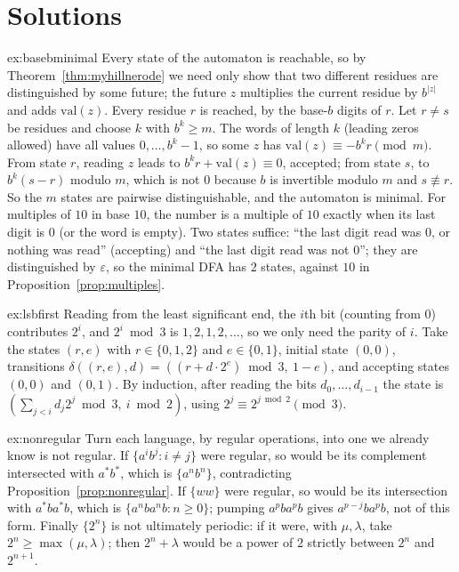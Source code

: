 \section{Solutions}

\begin{solution}{ex:basebminimal}
\idea Every state of the automaton is reachable, so by Theorem~\ref{thm:myhillnerode} we need only show that two different residues are distinguished by some future; the future $z$ multiplies the current residue by $b^{|z|}$ and adds $\mathrm{val}(z)$.
\writeup Every residue $r$ is reached, by the base-$b$ digits of $r$. Let $r\ne s$ be residues and choose $k$ with $b^k\ge m$. The words of length $k$ (leading zeros allowed) have all values $0,\dots,b^k-1$, so some $z$ has $\mathrm{val}(z)\equiv-b^kr\pmod m$. From state $r$, reading $z$ leads to $b^kr+\mathrm{val}(z)\equiv0$, accepted; from state $s$, to $b^k(s-r)$ modulo $m$, which is not $0$ because $b$ is invertible modulo $m$ and $s\not\equiv r$. So the $m$ states are pairwise distinguishable, and the automaton is minimal.
For multiples of $10$ in base $10$, the number is a multiple of $10$ exactly when its last digit is $0$ (or the word is empty). Two states suffice: ``the last digit read was $0$, or nothing was read'' (accepting) and ``the last digit read was not $0$''; they are distinguished by $\varepsilon$, so the minimal DFA has $2$ states, against $10$ in Proposition~\ref{prop:multiples}.
\end{solution}

\begin{solution}{ex:lsbfirst}
\idea Reading from the least significant end, the $i$th bit (counting from $0$) contributes $2^i$, and $2^i\bmod3$ is $1,2,1,2,\dots$, so we only need the parity of $i$.
\writeup Take the states $(r,e)$ with $r\in\{0,1,2\}$ and $e\in\{0,1\}$, initial state $(0,0)$, transitions $\delta((r,e),d)=((r+d\cdot2^e)\bmod3,\ 1-e)$, and accepting states $(0,0)$ and $(0,1)$. By induction, after reading the bits $d_0,\dots,d_{i-1}$ the state is $(\sum_{j<i}d_j2^j\bmod3,\ i\bmod2)$, using $2^j\equiv2^{j\bmod2}\pmod3$.
\end{solution}

\begin{solution}{ex:nonregular}
\idea Turn each language, by regular operations, into one we already know is not regular.
\writeup If $\{a^ib^j:i\ne j\}$ were regular, so would be its complement intersected with $a^*b^*$, which is $\{a^nb^n\}$, contradicting Proposition~\ref{prop:nonregular}. If $\{ww\}$ were regular, so would be its intersection with $a^*ba^*b$, which is $\{a^nba^nb:n\ge0\}$; pumping $a^pba^pb$ gives $a^{p-j}ba^pb$, not of this form. Finally $\{2^n\}$ is not ultimately periodic: if it were, with $\mu,\lambda$, take $2^n\ge\max(\mu,\lambda)$; then $2^n+\lambda$ would be a power of $2$ strictly between $2^n$ and $2^{n+1}$.
\end{solution}

